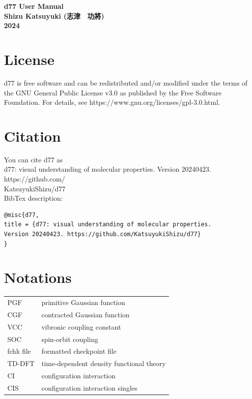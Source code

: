 ﻿\documentclass[11pt,a4paper,openany]{article}
\begin{document}
\pagestyle{empty}
{\textbf{}}
\vspace{30mm}
\begin{center}
{\bf
\Huge{d77 User Manual} \\
\vspace{10mm} 
\vspace{100mm}       
\LARGE{Shizu Katsuyuki (志津　功將)}\\
\vspace{10mm} 
\LARGE{2024}
}
\end{center}
\clearpage

\pagestyle{plain}


\section{License}
\noindent
d77 is free software and can be redistributed and/or modified
under the terms of the GNU General Public License v3.0
as published by the Free Software Foundation.
For details, see https://www.gnu.org/licenses/gpl-3.0.html.

\section{Citation}
\noindent
You can cite d77 as\vspace{3mm}\\
d77: visual understanding of molecular properties. Version 20240423. https://github.com/\\
KatsuyukiShizu/d77\\

\noindent
BibTex description:
\begin{verbatim}
@misc{d77,
title = {d77: visual understanding of molecular properties. 
Version 20240423. https://github.com/KatsuyukiShizu/d77}
}
\end{verbatim}

\section{Notations}
\noindent
\begin{tabular}{ll}
PGF & primitive Gaussian function \\
CGF & contracted Gaussian function \\
VCC & vibronic coupling constant \\
SOC & spin-orbit coupling \\
fchk file & formatted checkpoint file \\
TD-DFT & time-dependent density functional theory \\
CI & configuration interaction\\
CIS & configuration interaction singles
\end{tabular}
\end{document}
